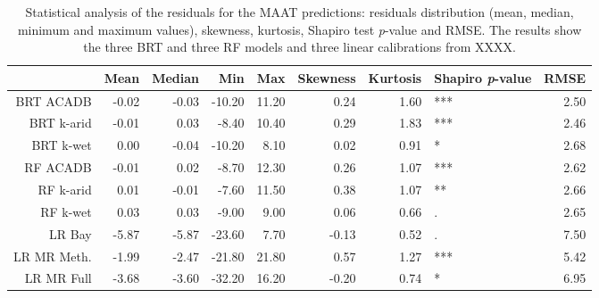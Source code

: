 \begin{table}[ht]
\centering
\caption{Statistical analysis of the residuals for the MAAT predictions: residuals distribution (mean, median, minimum and maximum values), skewness, kurtosis, Shapiro test \textit{p}-value and RMSE. The results show the three BRT and three RF models and three linear calibrations from XXXX.} 
\label{SI_Table_res}
\begin{tabular}{rrrrrrrlr}
  \toprule
 & Mean & Median & Min & Max & Skewness & Kurtosis & Shapiro \textit{p}-value & RMSE \\ 
  \midrule
BRT ACADB & -0.02 & -0.03 & -10.20 & 11.20 & 0.24 & 1.60 & *** & 2.50 \\ 
  BRT k-arid & -0.01 & 0.03 & -8.40 & 10.40 & 0.29 & 1.83 & *** & 2.46 \\ 
  BRT k-wet & 0.00 & -0.04 & -10.20 & 8.10 & 0.02 & 0.91 & * & 2.68 \\ 
  RF ACADB & -0.01 & 0.02 & -8.70 & 12.30 & 0.26 & 1.07 & *** & 2.62 \\ 
  RF k-arid & 0.01 & -0.01 & -7.60 & 11.50 & 0.38 & 1.07 & ** & 2.66 \\ 
  RF k-wet & 0.03 & 0.03 & -9.00 & 9.00 & 0.06 & 0.66 & . & 2.65 \\ 
  LR Bay & -5.87 & -5.87 & -23.60 & 7.70 & -0.13 & 0.52 & . & 7.50 \\ 
  LR MR Meth. & -1.99 & -2.47 & -21.80 & 21.80 & 0.57 & 1.27 & *** & 5.42 \\ 
  LR MR Full & -3.68 & -3.60 & -32.20 & 16.20 & -0.20 & 0.74 & * & 6.95 \\ 
   \bottomrule
\end{tabular}
\end{table}
